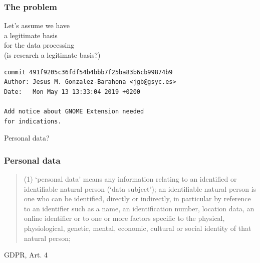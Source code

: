 \documentclass[17pt,aspectratio=169,hyperref={pdfusetitle,colorlinks,allcolors=olive}]{beamer}
\begin{document}
\begin{frame}[fragile]
  \frametitle{The problem}

  \begin{center}
  {\Large
    Let's assume we have \\
    a legitimate basis \\
    for the data processing \\
    \vspace{1cm}
    (is research a legitimate basis?) \\
  }
  \end{center}
\end{frame}


\begin{frame}[fragile]

{\small
\begin{verbatim}
commit 491f9205c36fdf54b4bbb7f25ba83b6cb99874b9
Author: Jesus M. Gonzalez-Barahona <jgb@gsyc.es>
Date:   Mon May 13 13:33:04 2019 +0200

Add notice about GNOME Extension needed
for indications.
\end{verbatim}  
}

\pause

\begin{center}
  {\Large
    Personal data?
  }
\end{center}

\end{frame}


\begin{frame}[fragile]
  \frametitle{Personal data}

  {\footnotesize
  \begin{quotation}
    (1) ‘personal data’ means any information relating to an identified or identifiable natural person (‘data subject’); an identifiable natural person is one who can be identified, directly or indirectly, in particular by reference to an identifier such as a name, an identification number, location data, an online identifier or to one or more factors specific to the physical, physiological, genetic, mental, economic, cultural or social identity of that natural person;
  \end{quotation}
  }
  
  \begin{flushright}
    GDPR, Art. 4
  \end{flushright}
\end{frame}
\end{document}
